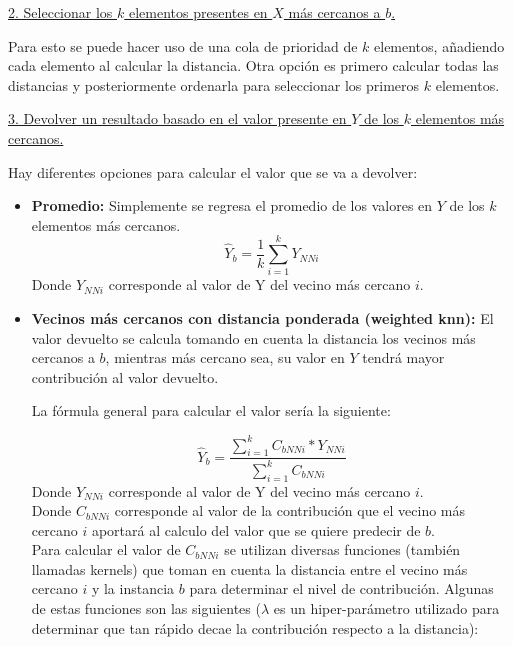 \documentclass[11pt,fleqn]{book} %
\begin{document}
\underline{2. Seleccionar los $k$ elementos presentes en $X$ más cercanos a $b$.}

Para esto se puede hacer uso de una cola de prioridad de $k$ elementos, añadiendo cada elemento al calcular la distancia. Otra opción es primero calcular todas las distancias y posteriormente ordenarla para seleccionar los primeros $k$ elementos.

\underline{3. Devolver un resultado basado en el valor presente en $Y$ de los $k$ elementos más cercanos.}

Hay diferentes opciones para calcular el valor que se va a devolver:

\begin{itemize}
\item \textbf{Promedio: } Simplemente se regresa el promedio de los valores en $Y$ de los $k$ elementos más cercanos.
\begin{equation}
\hat{Y}_b = \frac{1}{k} \sum_{i=1}^{k} Y_{NNi}
\end{equation}
Donde $Y_{NNi}$ corresponde al valor de Y del vecino más cercano $i$.\\

\item \textbf{Vecinos más cercanos con distancia ponderada (weighted knn):} El valor devuelto se calcula tomando en cuenta la distancia los vecinos más cercanos a $b$, mientras más cercano sea, su valor en $Y$ tendrá mayor contribución al valor devuelto.

La fórmula general para calcular el valor sería la siguiente:

\begin{equation}
\hat{Y}_b=\frac{\sum_{i=1}^{k} C_{bNNi}*Y_{NNi}}{\sum_{i=1}^{k} C_{bNNi}} 
\end{equation}
Donde $Y_{NNi}$ corresponde al valor de Y del vecino más cercano $i$.\\
Donde $C_{bNNi}$ corresponde al valor de la contribución que el vecino más cercano $i$ aportará al calculo del valor que se quiere predecir de $b$.\\

Para calcular el valor de $C_{bNNi}$ se utilizan diversas funciones (también llamadas kernels) que toman en cuenta la distancia entre el vecino más cercano $i$ y la instancia $b$ para determinar el nivel de contribución. Algunas de estas funciones son las siguientes ($\lambda$ es un hiper-parámetro utilizado para determinar que tan rápido decae la contribución respecto a la distancia):\\


\end{itemize}
\end{document}
